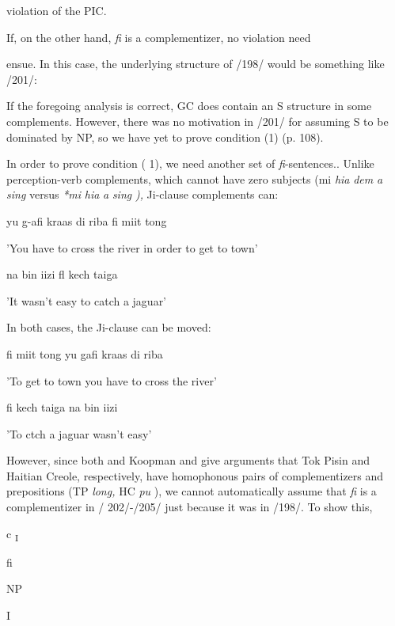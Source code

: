 violation of the PIC.

If, on the other hand, \textit{fi} is a complementizer, no violation need

ensue. In this case, the underlying structure of /198/ would be some\-thing like /201/:


If the foregoing analysis is correct, GC does contain an S structure in some complements. However, there was no motivation in /201/ for assuming S to be dominated by NP, so we have yet to prove condi\-tion (1) (p. 108).

In order to prove condition ( 1), we need another set of \textit{fi}-sentences.. Unlike perception-verb complements, which cannot have zero subjects (mi \textit{hia} \textit{dem} \textit{a} \textit{sing} versus \textit{*mi} \textit{hia} \textit{a} \textit{sing} \textit{),} Ji{}-clause comple\-ments can:

\ea\label{ex:202}
 yu g{}-afi kraas di riba fi miit tong
\glt
\z

'You have to cross the river in order to get to town'



\ea\label{ex:203}
 na bin iizi fl kech taiga
\glt
\z

'It wasn't easy to catch a jaguar'

In both cases, the Ji-clause can be moved:

\ea\label{ex:204}
 fi miit tong yu gafi kraas di riba
\glt
\z

'To get to town you have to cross the river'

\ea\label{ex:205}
 fi kech taiga na bin iizi
\glt
\z

'To ctch a jaguar wasn't easy'

However, since both \citet{Woolford1979} and Koopman and \citet{Lefebvre1981} give arguments that Tok Pisin and Haitian Creole, respectively, have homophonous pairs of complementizers and prepositions (TP
\textit{long,} HC \textit{pu} ), we cannot automatically assume that \textit{fi} is a complementizer in / 202/-/205/ just because it was in /198/. To show this,

\ea\label{ex:207}

\glt
\z

c \textsubscript{I}

fi

NP

I

